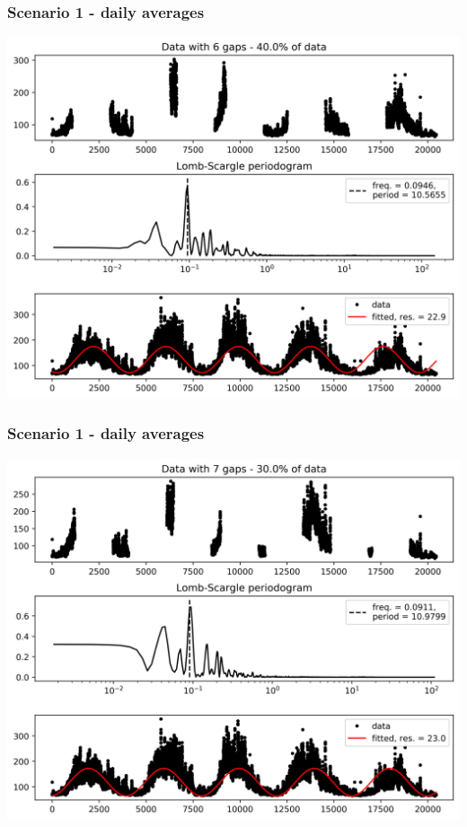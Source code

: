 \documentclass{beamer}
\begin{document}
\begin{frame}
\frametitle{Scenario 1 - daily averages}
\begin{center}
\includegraphics[scale=0.55]{../scripts/dataset1/periodograms_ny2.0_model2_Ng6.jpg}
\end{center}
\end{frame}
\begin{frame}
\frametitle{Scenario 1 - daily averages}
\begin{center}
\includegraphics[scale=0.55]{../scripts/dataset1/periodograms_ny2.0_model2_Ng7.jpg}
\end{center}
\end{frame}
\end{document}
